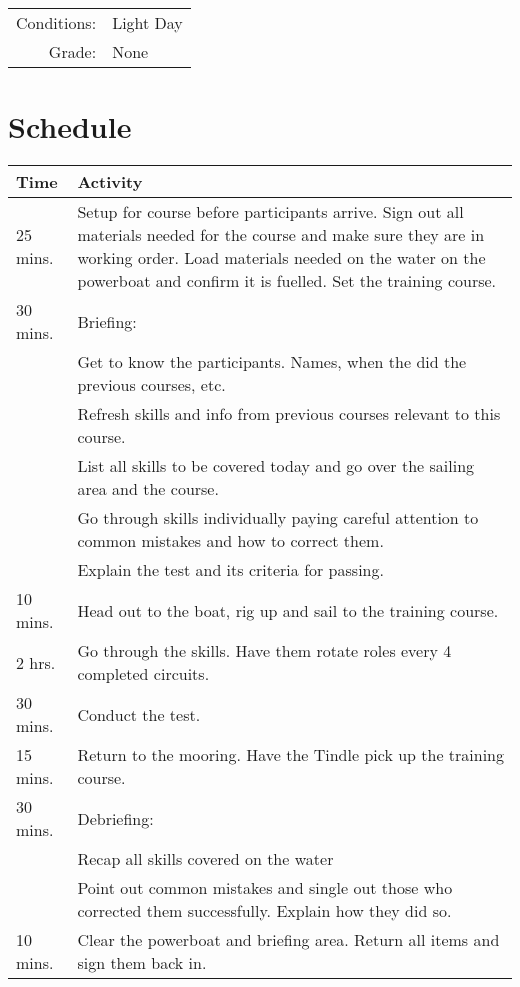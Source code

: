 \documentclass[12pt]{scrartcl}
\begin{document}
\label{tab:requirements}
\begin{tabular}{rl}
	Conditions: & Light Day \\
	Grade: & None \\
\end{tabular}

\newpage

\section{Schedule} \label{sec:schedule}

\label{tab:schedule}
\begin{tabularx}{\textwidth}{|X|X|}
	\hline
	\textbf{Time} & \textbf{Activity} \\
	\hline
	25 mins. & Setup for course before participants arrive. Sign out all materials needed for the course and make sure they are in working order. Load materials needed on the water on the powerboat and confirm it is fuelled. Set the training course. \\
	\hline
	30 mins. & Briefing: \\
	& Get to know the participants. Names, when the did the previous courses, etc. \\
	& Refresh skills and info from previous courses relevant to this course. \\
	& List all skills to be covered today and go over the sailing area and the course. \\
	& Go through skills individually paying careful attention to common mistakes and how to correct them. \\
	& Explain the test and its criteria for passing. \\
	\hline
	10 mins. & Head out to the boat, rig up and sail to the training course. \\
	\hline
	2 hrs. & Go through the skills. Have them rotate roles every 4 completed circuits. \\
	\hline
	30 mins. & Conduct the test. \\
	\hline
	15 mins. & Return to the mooring. Have the Tindle pick up the training course. \\
	\hline
	30 mins. & Debriefing: \\
	& Recap all skills covered on the water \\
	& Point out common mistakes and single out those who corrected them successfully. Explain how they did so. \\
	\hline
	10 mins. & Clear the powerboat and briefing area. Return all items and sign them back in. \\
	\hline
\end{tabularx}
\end{document}
